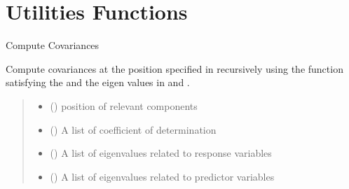 \documentclass[letterpaper,10pt,english]{sphinxmanual}
\begin{document}
\sphinxstepscope


\section{Utilities Functions}
\label{\detokenize{Utilities:module-pysimrel.utilities}}\label{\detokenize{Utilities:utilities-functions}}\label{\detokenize{Utilities::doc}}

\begin{fulllineitems}
\label{\detokenize{Utilities:pysimrel.utilities.get_cov}}
\pysigstartsignatures
{}
\pysigstopsignatures
\sphinxAtStartPar
Compute Covariances

\sphinxAtStartPar
Compute covariances at the position specified in  recursively using the
function  satisfying the  and the eigen values in  and .
\begin{quote}\begin{description}
\begin{itemize}
\item {} 
\sphinxAtStartPar
{} () \textendash{} position of relevant components

\item {} 
\sphinxAtStartPar
{} () \textendash{} A list of coefficient of determination

\item {} 
\sphinxAtStartPar
{} () \textendash{} A list of eigenvalues related to response variables

\item {} 
\sphinxAtStartPar
{} () \textendash{} A list of eigenvalues related to predictor variables


\end{itemize}
\end{description}
\end{quote}
\end{fulllineitems}
\end{document}
